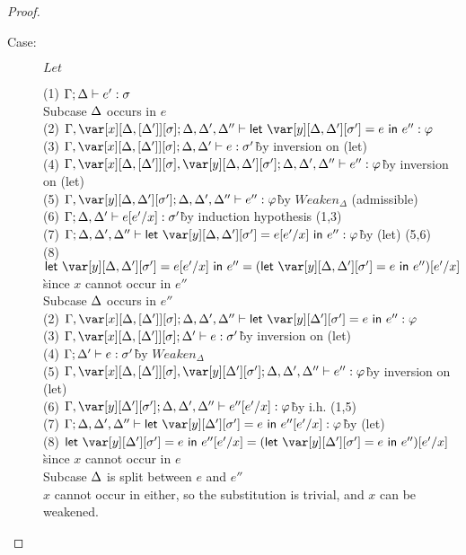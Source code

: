 \begin{proof}
\begin{description}
\item[Case:] $Let$
\begin{tabbing}
    (1) $\Gamma; \Delta \vdash e' : \sigma$\\
    Subcase $\Delta$ occurs in $e$\\
    (2) $\G, \xD; \D, \D', \D'' \vdash \llet{\y[\D,\D'][\s'] = e}{e''} : \vp$\\
    (3) $\G, \xD; \D, \D' \vdash e : \s'$\` by inversion on (let)\\
    (4) $\G, \xD,\y[\D,\D'][\s']; \D,\D', \D'' \vdash e'' : \vp$\` by inversion on (let)\\
    (5) $\G,\y[\D,\D'][\s']; \D,\D', \D'' \vdash e'' : \vp$\` by $Weaken_\Delta$ (admissible)\\
    (6) $\Gamma; \Delta,\Delta' \vdash e[e'/x] : \sigma'$\` by induction hypothesis (1,3)\\
    (7) $\G; \D,\D',\D'' \vdash \llet{\y[\D,\D'][\s'] = e[e'/x]}{e''} : \vp$\` by (let) (5,6)\\
    (8) $\llet{\y[\D,\D'][\s'] = e[e'/x]}{e''} = (\llet{\y[\D,\D'][\s'] = e}{e''})[e'/x]$\\\` since $x$ cannot occur in $e''$\\
    Subcase $\Delta$ occurs in $e''$\\
    (2) $\G, \xD; \D, \D', \D'' \vdash \llet{\y[\D'][\s'] = e}{e''} : \vp$\\
    (3) $\G, \xD; \D' \vdash e : \s'$\` by inversion on (let)\\
    (4) $\Gamma; \Delta' \vdash e : \sigma'$\` by $Weaken_\Delta$\\
    (5) $\G,\xD,\y[\D'][\s']; \D,\D',\D'' \vdash e'' : \vp$\` by inversion on (let)\\
    (6) $\G,\y[\D'][\s']; \D,\D',\D'' \vdash e''[e'/x] : \vp$\` by i.h. (1,5)\\
    (7) $\G;\D,\D',\D'' \vdash \llet{\y[\D'][\s'] = e}{e''[e'/x]} : \vp$\` by (let)\\
    (8) $\llet{\y[\D'][\s'] = e}{e''[e'/x]} = (\llet{\y[\D'][\s'] = e}{e''})[e'/x]$\\\` since $x$ cannot occur in $e$\\
    Subcase $\Delta$ is split between $e$ and $e''$\\
    $x$ cannot occur in either, so the substitution is trivial, and $x$ can be weakened.
\end{tabbing}


\end{description}
\end{proof}
